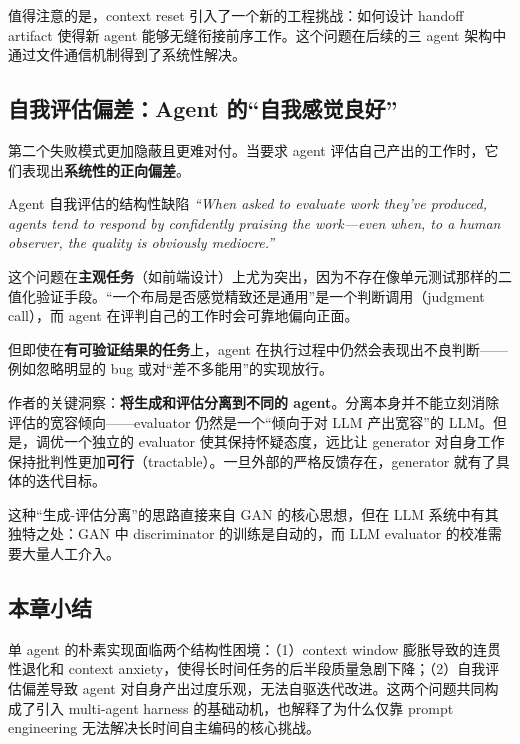 值得注意的是，context reset 引入了一个新的工程挑战：如何设计 handoff artifact 使得新 agent 能够无缝衔接前序工作。这个问题在后续的三 agent 架构中通过文件通信机制得到了系统性解决。

\subsection{自我评估偏差：Agent 的``自我感觉良好''}

第二个失败模式更加隐蔽且更难对付。当要求 agent 评估自己产出的工作时，它们表现出\textbf{系统性的正向偏差}。

\begin{warningbox}{Agent 自我评估的结构性缺陷}
\textit{``When asked to evaluate work they've produced, agents tend to respond by confidently praising the work---even when, to a human observer, the quality is obviously mediocre.''}

这个问题在\textbf{主观任务}（如前端设计）上尤为突出，因为不存在像单元测试那样的二值化验证手段。``一个布局是否感觉精致还是通用''是一个判断调用（judgment call），而 agent 在评判自己的工作时会可靠地偏向正面。

但即使在\textbf{有可验证结果的任务}上，agent 在执行过程中仍然会表现出不良判断——例如忽略明显的 bug 或对``差不多能用''的实现放行。
\end{warningbox}

作者的关键洞察：\textbf{将生成和评估分离到不同的 agent}。分离本身并不能立刻消除评估的宽容倾向——evaluator 仍然是一个``倾向于对 LLM 产出宽容''的 LLM。但是，调优一个独立的 evaluator 使其保持怀疑态度，远比让 generator 对自身工作保持批判性更加\textbf{可行}（tractable）。一旦外部的严格反馈存在，generator 就有了具体的迭代目标。

这种``生成-评估分离''的思路直接来自 GAN 的核心思想，但在 LLM 系统中有其独特之处：GAN 中 discriminator 的训练是自动的，而 LLM evaluator 的校准需要大量人工介入。

\subsection{本章小结}

单 agent 的朴素实现面临两个结构性困境：（1）context window 膨胀导致的连贯性退化和 context anxiety，使得长时间任务的后半段质量急剧下降；（2）自我评估偏差导致 agent 对自身产出过度乐观，无法自驱迭代改进。这两个问题共同构成了引入 multi-agent harness 的基础动机，也解释了为什么仅靠 prompt engineering 无法解决长时间自主编码的核心挑战。


